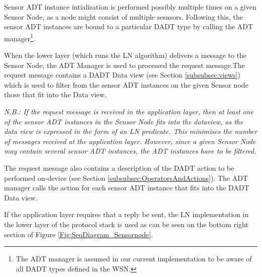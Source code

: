 Sensor ADT instance intialisation is performed possibly
multiple times
on a given Sensor Node, as a node might consist of multiple sesnsors. Following
this, the sensor ADT instances are bound to a particular DADT type by calling
the ADT manager\footnote{The ADT manager is assumed in our
current implementation to be aware of all DADT types defined in the WSN.}.

When the lower layer (which runs the LN algorithm) delivers a message to the
Sensor Node, the ADT Manager is used to processed the request message.The
request message contains a DADT Data view (see Section \ref{subsubsec:views})
which is used to filter from the sensor ADT instances on the given Sensor node
those that fit into the Data view. %

\emph{N.B.: If the request message is received in the application layer, then at least
one of the sensor ADT instances in the Sensor Node fits into the dataview, as
the data view is expressed in the form of an LN predicate. This minimises the
number of messages received at the application layer. However, since a given
Sensor Node may contain several sensor ADT instances, the ADT instances have to
be filtered.}

The request message also contains a description of the DADT action to be
performed on-device (see Section
\ref{subsubsec:OperatorsAndActions}). The ADT manager calls the action for each
sensor ADT instance that fits into the DADT Data view. 

If the application layer requires that a reply be sent, the LN implementation in
the lower layer of the protocol stack is used as can be seen on the bottom right
section of Figure \ref{Fig:SeqDiagram_Sensornode}.


